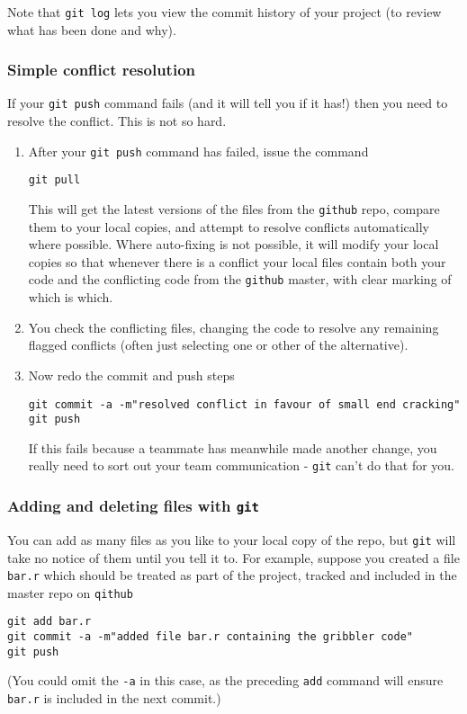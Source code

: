 \documentclass[10pt] {article}
\theoremstyle{definition}
\begin{document}
Note that \verb+git log+ lets you view the commit history of your project (to review what has been done and why).

\subsubsection{Simple conflict resolution}

If your {\tt git push} command fails (and it will tell you if it has!) then you need to resolve the conflict. This is not so hard. 

\begin{enumerate}
\item After your {\tt git push} command has failed, issue the command
\begin{verbatim}
git pull
\end{verbatim}
This will get the latest versions of the files from the {\tt github} repo, compare them to your local copies, and attempt to resolve conflicts automatically where possible. Where auto-fixing is not possible, it will modify your local copies so that whenever there is a conflict your local files contain both your code and the conflicting code from the {\tt github} master, with clear marking of which is which. 
\item You check the conflicting files, changing the code to resolve any remaining flagged conflicts (often just selecting one or other of the alternative). 
\item Now redo the commit and push steps
\begin{verbatim}
git commit -a -m"resolved conflict in favour of small end cracking"
git push
\end{verbatim} 
If this fails because a teammate has meanwhile made another change, you really need to sort out your team communication - {\tt git} can't do that for you. 
\end{enumerate}

\subsubsection{Adding and deleting files with {\tt git}}

You can add as many files as you like to your local copy of the repo, but {\tt git} will take no notice of them until you tell it to. For example, suppose you created a file {\tt bar.r} which should be treated as part of the project, tracked and included in the master repo on {\tt qithub}
\begin{verbatim}
git add bar.r
git commit -a -m"added file bar.r containing the gribbler code"
git push
\end{verbatim}
(You could omit the \verb+-a+ in this case, as the preceding \verb+add+ command will ensure \verb+bar.r+ is included in the next commit.)
\end{document}
